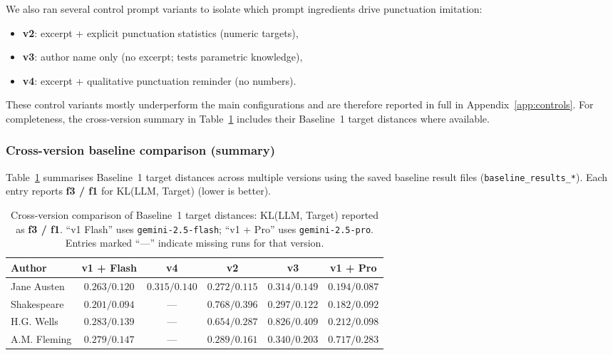 \documentclass{article}
\begin{document}
We also ran several control prompt variants to isolate which prompt ingredients drive punctuation imitation:
\begin{itemize}
    \item \textbf{v2}: excerpt + explicit punctuation statistics (numeric targets),
    \item \textbf{v3}: author name only (no excerpt; tests parametric knowledge),
    \item \textbf{v4}: excerpt + qualitative punctuation reminder (no numbers).
\end{itemize}

These control variants mostly underperform the main configurations and are therefore reported in full in Appendix~\ref{app:controls}. For completeness, the cross-version summary in Table~\ref{tab:baseline_cross_version_q1} includes their Baseline~1 target distances where available.

\subsubsection{Cross-version baseline comparison (summary)}
\label{subsec:baseline_cross_version}

Table~\ref{tab:baseline_cross_version_q1} summarises Baseline~1 target distances across multiple versions using the saved baseline result files (\texttt{baseline\_results\_*}). Each entry reports \textbf{f3 / f1} for KL(LLM, Target) (lower is better).

\begin{table}[htbp]
\centering
\begin{tabular}{lccccc}
\toprule
Author & v1 + Flash & v4 & v2 & v3 & v1 + Pro \\
\midrule
Jane Austen & $0.263/0.120$ & $0.315/0.140$ & $0.272/0.115$ & $0.314/0.149$ & $0.194/0.087$ \\
Shakespeare & $0.201/0.094$ & --- & $0.768/0.396$ & $0.297/0.122$ & $0.182/0.092$ \\
H.G. Wells & $0.283/0.139$ & --- & $0.654/0.287$ & $0.826/0.409$ & $0.212/0.098$ \\
A.M. Fleming & $0.279/0.147$ & --- & $0.289/0.161$ & $0.340/0.203$ & $0.717/0.283$ \\
\bottomrule
\end{tabular}
\caption{Cross-version comparison of Baseline~1 target distances: KL(LLM, Target) reported as \textbf{f3 / f1}. ``v1 Flash'' uses \texttt{gemini-2.5-flash}; ``v1 + Pro'' uses \texttt{gemini-2.5-pro}. Entries marked ``---'' indicate missing runs for that version.}
\label{tab:baseline_cross_version_q1}
\end{table}
\end{document}
